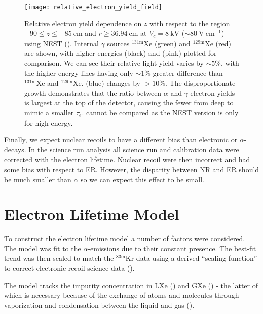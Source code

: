 \begin{figure}
\centering
\texttt{[image: relative\_electron\_yield\_field]}
\caption{Relative electron yield dependence on $z$ with respect to the region $-90 \leq z \leq -85\ \mathrm{cm}$ and
$r \geq 36.94\ \mathrm{cm}$ at $V_c = 8\ \mathrm{kV}$ (${\sim}80\ \mathrm{V\ cm^{-1}}$) using NEST ().  Internal
$\gamma$ sources $\mathrm{^{131m}Xe}$ (green) and
$\mathrm{^{129m}Xe}$
(red) are shown, with higher energies  (black) and  (pink) plotted for comparison.  We can see their relative
light yield varies by ${\sim} 5\%$, with the higher-energy lines having only ${\sim} 1\%$ greater difference than $\mathrm{^{131m}Xe}$ and
$\mathrm{^{129m}Xe}$.   (blue) changes by $> 10\%$.  The disproportionate growth demonstrates that the ratio between
$\alpha$ and $\gamma$ electron yields is largest at the top of the detector, causing the fewer \electron from deep \alphadecays to
mimic a smaller $\tau_e$.  \metakr cannot be compared as the NEST version is only for high-energy.}
\label{fig:electron_lifetimes_rn222_vs_kr83m_field_z}
\end{figure}

Finally, we expect nuclear recoils to have a different bias than electronic or $\alpha$-decays.  In the science run analysis all
science run and calibration data were corrected with the \metakr electron lifetime.  Nuclear recoil \cstwob were then incorrect and had
some bias with respect to ER.  However, the disparity between NR and ER should be much smaller than $\alpha$ so we can expect this effect
to be small.



\section{Electron Lifetime Model}
\label{sec:electron_lifetime_model}
To construct the electron lifetime model a number of factors were considered.  The model was fit to the  $\alpha$-emissions
due to their constant presence.  The best-fit trend was then scaled to match the $\mathrm{^{83m}Kr}$ data using a derived
``scaling function'' to correct electronic recoil science data ().

The model tracks the impurity concentration in LXe (\il) and GXe (\ig) - the latter of which is necessary because of the
exchange of atoms and molecules through vaporization and condensation between the liquid and gas
().



